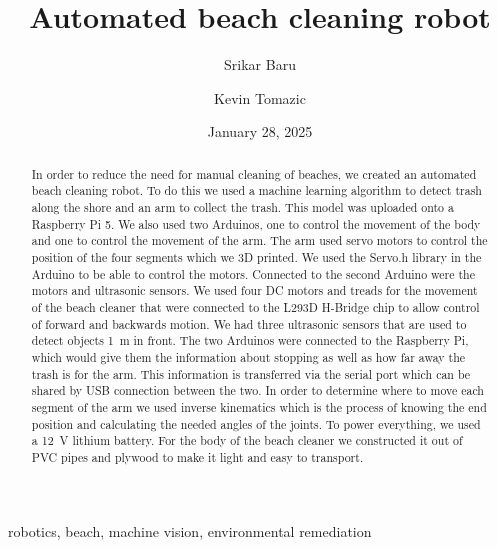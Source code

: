 \documentclass[12pt,conference,onecolumn]{IEEEtran}
\title{Automated beach cleaning robot}
\author{Srikar Baru \and Kevin Tomazic}
\date{January 28, 2025}
\newcommand{\keywords}{robotics, beach, machine vision, environmental remediation}
\begin{document}
\maketitle 

\begin{abstract}
In order to reduce the need for manual cleaning of beaches, we created an automated beach cleaning robot. To do this we used a machine learning algorithm to detect trash along the shore and an arm to collect the trash. This model was uploaded onto a Raspberry Pi 5. We also used two Arduinos, one to control the movement of the body and one to control the movement of the arm. The arm used servo motors to control the position of the four segments which we 3D printed. We used the Servo.h library in the Arduino to be able to control the motors. Connected to the second Arduino were the motors and ultrasonic sensors. We used four DC motors and treads for the movement of the beach cleaner that were connected to the L293D H-Bridge chip to allow control of forward and backwards motion. We had three ultrasonic sensors that are used to detect objects \qty{1}{\meter} in front. The two Arduinos were connected to the Raspberry Pi, which would give them the information about stopping as well as how far away the trash is for the arm. This information is transferred via the serial port which can be shared by USB connection between the two. In order to determine where to move each segment of the arm we used inverse kinematics which is the process of knowing the end position and calculating the needed angles of the joints. To power everything, we used a \qty{12}{\volt} lithium battery. For the body of the beach cleaner we constructed it out of PVC pipes and plywood to make it light and easy to transport.
\end{abstract}

\begin{IEEEkeywords}
\keywords
\end{IEEEkeywords}
\end{document}
